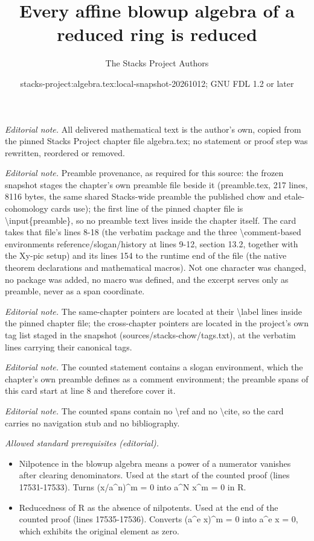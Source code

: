 \documentclass[10pt,a4paper]{amsart}
\title{Every affine blowup algebra of a reduced ring is reduced}
\author{The Stacks Project Authors}
\date{stacks-project:algebra.tex:local-snapshot-20261012; GNU FDL 1.2 or later}
\theoremstyle{plain}
\theoremstyle{definition}
\theoremstyle{remark}
\numberwithin{equation}{subsection}
\begin{document}
\maketitle
\noindent\textit{Editorial note.} All delivered mathematical text is the author's own, copied from the pinned Stacks Project chapter file algebra.tex; no statement or proof step was rewritten, reordered or removed.\par\medskip
\noindent\textit{Editorial note.} Preamble provenance, as required for this source: the frozen snapshot stages the chapter's own preamble file beside it (preamble.tex, 217 lines, 8116 bytes, the same shared Stacks-wide preamble the published chow and etale-cohomology cards use); the first line of the pinned chapter file is \textbackslash{}input\{preamble\}, so no preamble text lives inside the chapter itself. The card takes that file's lines 8-18 (the verbatim package and the three \textbackslash{}comment-based environments reference/slogan/history at lines 9-12, section 13.2, together with the Xy-pic setup) and its lines 154 to the runtime end of the file (the native theorem declarations and mathematical macros). Not one character was changed, no package was added, no macro was defined, and the excerpt serves only as preamble, never as a span coordinate.\par\medskip
\noindent\textit{Editorial note.} The same-chapter pointers are located at their \textbackslash{}label lines inside the pinned chapter file; the cross-chapter pointers are located in the project's own tag list staged in the snapshot (sources/stacks-chow/tags.txt), at the verbatim lines carrying their canonical tags.\par\medskip
\noindent\textit{Editorial note.} The counted statement contains a slogan environment, which the chapter's own preamble defines as a comment environment; the preamble spans of this card start at line 8 and therefore cover it.\par\medskip
\noindent\textit{Editorial note.} The counted spans contain no \textbackslash{}ref and no \textbackslash{}cite, so the card carries no navigation stub and no bibliography.\par\medskip
\noindent\textit{Allowed standard prerequisites (editorial).}\begin{itemize}
\item Nilpotence in the blowup algebra means a power of a numerator vanishes after clearing denominators. Used at the start of the counted proof (lines 17531-17533). Turns (x/a\textasciicircum{}n)\textasciicircum{}m = 0 into a\textasciicircum{}N x\textasciicircum{}m = 0 in R.
\item Reducedness of R as the absence of nilpotents. Used at the end of the counted proof (lines 17535-17536). Converts (a\textasciicircum{}e x)\textasciicircum{}m = 0 into a\textasciicircum{}e x = 0, which exhibits the original element as zero.
\end{itemize}\medskip
\end{document}
